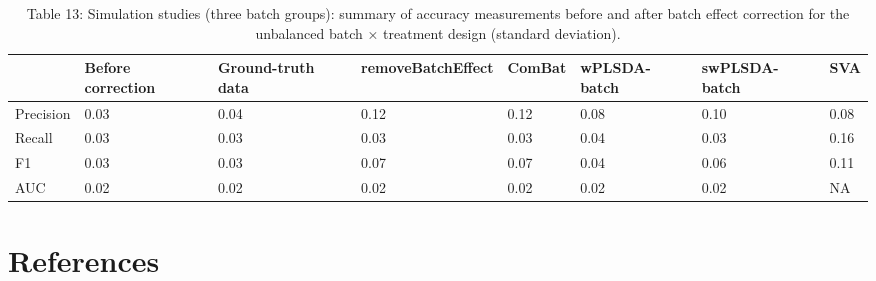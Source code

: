 \documentclass[
]{book}
\begin{document}
\begin{table}

\caption{\label{tab:unnamed-chunk-136}Table 13: Simulation studies (three batch groups): summary of accuracy measurements before and after batch effect correction for the unbalanced batch × treatment design (standard deviation).}
\centering
\begin{tabular}[t]{l|l|l|l|l|l|l|l}
\hline
  & Before correction & Ground-truth data & removeBatchEffect & ComBat & wPLSDA-batch & swPLSDA-batch & SVA\\
\hline
Precision & 0.03 & 0.04 & 0.12 & 0.12 & 0.08 & 0.10 & 0.08\\
\hline
Recall & 0.03 & 0.03 & 0.03 & 0.03 & 0.04 & 0.03 & 0.16\\
\hline
F1 & 0.03 & 0.03 & 0.07 & 0.07 & 0.04 & 0.06 & 0.11\\
\hline
AUC & 0.02 & 0.02 & 0.02 & 0.02 & 0.02 & 0.02 & NA\\
\hline
\end{tabular}
\end{table}

\hypertarget{references-3}{%
\section{References}\label{references-3}}

  
\end{document}
